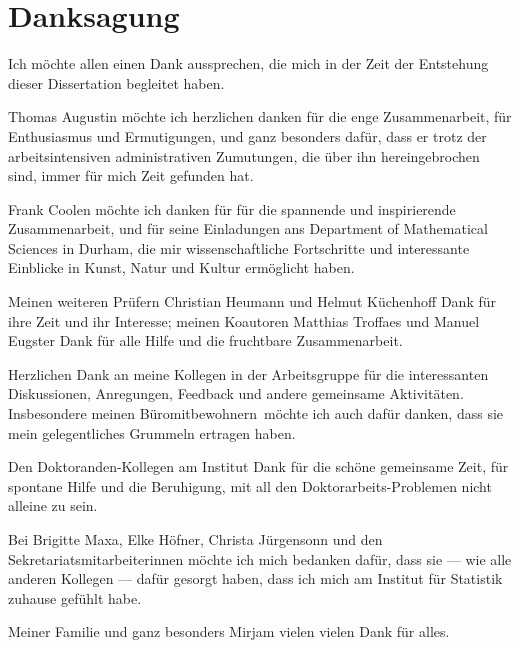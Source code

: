\chapter*{Danksagung}

Ich möchte allen einen Dank aussprechen,
die mich in der Zeit der Entstehung dieser Dissertation begleitet haben.

Thomas Augustin möchte ich herzlichen danken für die enge Zusammenarbeit,
für Enthusiasmus und Ermutigungen, und ganz besonders dafür, dass er
trotz der arbeitsintensiven administrativen Zumutungen,
die über ihn hereingebrochen sind, immer für mich Zeit gefunden hat.

Frank Coolen möchte ich danken für für die spannende und inspirierende Zusammenarbeit,
und für seine Einladungen ans Department of Mathematical Sciences in Durham,
die mir wissenschaftliche Fortschritte und interessante Einblicke in Kunst, Natur und Kultur ermöglicht haben.

Meinen weiteren Prüfern Christian Heumann und Helmut Küchenhoff Dank für ihre Zeit und ihr Interesse;
meinen Koautoren Matthias Troffaes und Manuel Eugster Dank für alle Hilfe und die fruchtbare Zusammenarbeit.

Herzlichen Dank an meine Kollegen in der Arbeitsgruppe für die interessanten Diskussionen, Anregungen, Feedback
und andere gemeinsame Aktivitäten.
Insbesondere meinen \glqq Büromitbewohnern\grqq\ möchte ich auch dafür danken,
dass sie mein gelegentliches Grummeln ertragen haben.

Den Doktoranden-Kollegen am Institut Dank für die schöne gemeinsame Zeit,
für spontane Hilfe und die Beruhigung, mit all den Doktorarbeits-Problemen nicht alleine zu sein.

Bei Brigitte Maxa, Elke Höfner, Christa Jürgensonn und den Sekretariatsmitarbeiterinnen
möchte ich mich bedanken dafür, dass sie --- wie alle anderen Kollegen --- dafür gesorgt haben,
dass ich mich am Institut für Statistik zuhause gefühlt habe.

Meiner Familie und ganz besonders Mirjam vielen vielen Dank für alles.

